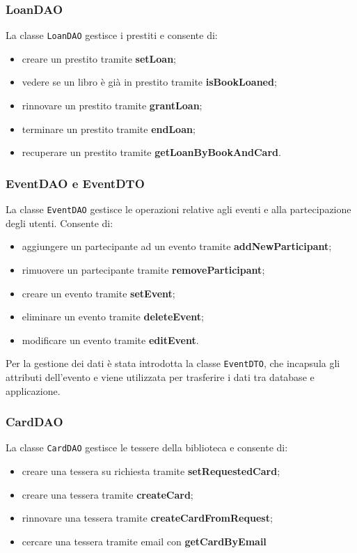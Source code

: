     \subsubsection{LoanDAO}
    La classe \texttt{LoanDAO} gestisce i prestiti e consente di:
    \begin{itemize}
        \item creare un prestito tramite \textbf{setLoan};
        \item vedere se un libro è già in prestito tramite \textbf{isBookLoaned};
        \item rinnovare un prestito tramite \textbf{grantLoan};
        \item terminare un prestito tramite \textbf{endLoan};
        \item recuperare un prestito tramite \textbf{getLoanByBookAndCard}.
    \end{itemize}

    \subsubsection{EventDAO e EventDTO}
    La classe \texttt{EventDAO} gestisce le operazioni relative agli eventi e alla partecipazione degli utenti. Consente di:
    \begin{itemize}
        \item aggiungere un partecipante ad un evento tramite \textbf{addNewParticipant};
        \item rimuovere un partecipante tramite \textbf{removeParticipant};
        \item creare un evento tramite \textbf{setEvent};
        \item eliminare un evento tramite \textbf{deleteEvent};
        \item modificare un evento tramite \textbf{editEvent}.
    \end{itemize}
    Per la gestione dei dati è stata introdotta la classe \texttt{EventDTO}, che incapsula gli attributi dell'evento e viene utilizzata per trasferire i dati tra database e applicazione.

    \subsubsection{CardDAO}
    La classe \texttt{CardDAO} gestisce le tessere della biblioteca e consente di:
    \begin{itemize}
        \item creare una tessera su richiesta tramite \textbf{setRequestedCard};
        \item creare una tessera tramite \textbf{createCard};
        \item rinnovare una tessera tramite \textbf{createCardFromRequest};
        \item cercare una tessera tramite email con \textbf{getCardByEmail}
    \end{itemize}

